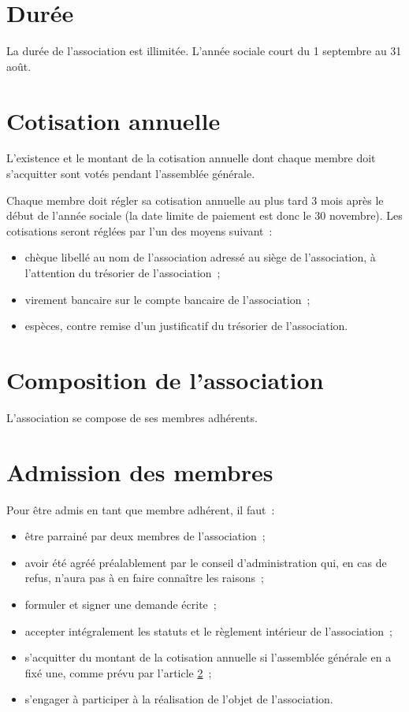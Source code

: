 \documentclass[12 pt]{article}
\begin{document}
\section{Durée}
\label{sec:duree}

La durée de l'association est illimitée. L'année sociale court du
1\ier{} septembre au 31 août.

\section{Cotisation annuelle}
\label{sec:cotisation-annuelle}

L'existence et le montant de la cotisation annuelle dont chaque membre
doit s'acquitter sont votés pendant l'assemblée générale.

Chaque membre doit régler sa cotisation annuelle au plus tard 3 mois
après le début de l'année sociale (la date limite de paiement est donc
le 30 novembre). Les cotisations seront réglées par l'un des moyens
suivant~:

\begin{itemize}
\item chèque libellé au nom de l'association adressé au siège de
  l'association, à l'attention du trésorier de l'association~;
\item virement bancaire sur le compte bancaire de l'association~;
\item espèces, contre remise d’un justificatif du trésorier de
  l'association.
\end{itemize}

\section{Composition de l'association}
\label{sec:composition-de-l-association}

L'association se compose de ses membres adhérents.

\section{Admission des membres}
\label{sec:admission-des-membres}

Pour être admis en tant que membre adhérent, il faut~:

\begin{itemize}
\item être parrainé par deux membres de l'association~;
\item avoir été agréé préalablement par le conseil d'administration
  qui, en cas de refus, n'aura pas à en faire connaître les raisons~;
\item formuler et signer une demande écrite~;
\item accepter intégralement les statuts et le règlement intérieur de
  l'association~;
\item s'acquitter du montant de la cotisation annuelle si l'assemblée
  générale en a fixé une, comme prévu par l'article
  \ref{sec:cotisation-annuelle}~;
\item s'engager à participer à la réalisation de l'objet de
  l'association.
\end{itemize}
\end{document}
